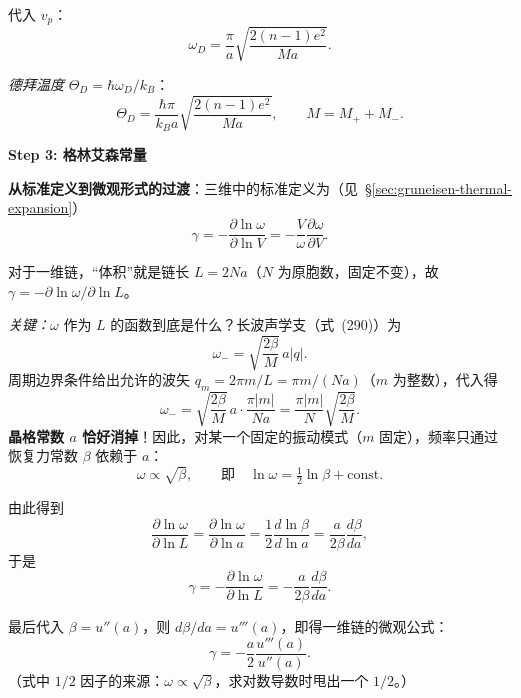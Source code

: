 \begin{derivationbox}[标准解题过程]
代入 $v_p$：
\begin{equation}
\omega_D=\frac{\pi}{a}\sqrt{\frac{2(n-1)e^2}{Ma}}.
\end{equation}

\textit{德拜温度} $\Theta_D=\hbar\omega_D/k_B$：
\begin{equation}
\boxed{\Theta_D=\frac{\hbar\pi}{k_Ba}\sqrt{\frac{2(n-1)e^2}{Ma}}},
\qquad M=M_++M_-.
\end{equation}

\textbf{Step 3: 格林艾森常量}

\textbf{从标准定义到微观形式的过渡}：三维中的标准定义为（见~\S\ref{sec:gruneisen-thermal-expansion}）
\begin{equation}
\gamma=-\frac{\partial\ln\omega}{\partial\ln V}=-\frac{V}{\omega}\frac{\partial\omega}{\partial V}.
\end{equation}

对于一维链，``体积''就是链长 $L=2Na$（$N$ 为原胞数，固定不变），故 $\gamma=-\partial\ln\omega/\partial\ln L$。

\textit{关键：}$\omega$ 作为 $L$ 的函数到底是什么？长波声学支（式~(290)）为
\begin{equation}
\omega_- = \sqrt{\frac{2\beta}{M}}\,a|q|.
\end{equation}
周期边界条件给出允许的波矢 $q_m=2\pi m/L=\pi m/(Na)$（$m$ 为整数），代入得
\begin{equation}
\omega_- = \sqrt{\frac{2\beta}{M}}\,a\cdot\frac{\pi|m|}{Na}
= \frac{\pi|m|}{N}\sqrt{\frac{2\beta}{M}}.
\end{equation}
\textbf{晶格常数 $a$ 恰好消掉}！因此，对某一个固定的振动模式（$m$ 固定），频率只通过恢复力常数 $\beta$ 依赖于 $a$：
\begin{equation}
\omega\propto\sqrt{\beta},\qquad\text{即}\quad \ln\omega = \tfrac12\ln\beta + \text{const}.
\end{equation}

由此得到
\begin{equation}
\frac{\partial\ln\omega}{\partial\ln L}
=\frac{\partial\ln\omega}{\partial\ln a}
=\frac12\frac{d\ln\beta}{d\ln a}
=\frac{a}{2\beta}\frac{d\beta}{da},
\end{equation}
于是
\begin{equation}
\gamma=-\frac{\partial\ln\omega}{\partial\ln L}=-\frac{a}{2\beta}\frac{d\beta}{da}.
\end{equation}

最后代入 $\beta=u''(a)$，则 $d\beta/da=u'''(a)$，即得一维链的微观公式：
\begin{equation}
\boxed{\gamma=-\frac{a}{2}\frac{u'''(a)}{u''(a)}}.
\end{equation}
（式中 $1/2$ 因子的来源：$\omega\propto\sqrt{\beta}$，求对数导数时甩出一个 $1/2$。）


\end{derivationbox}
